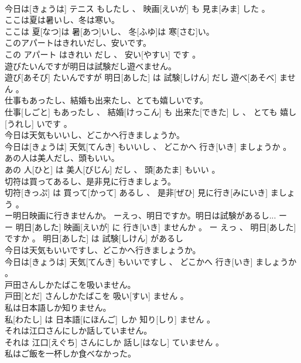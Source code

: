 \documentclass[8pt]{extreport}
\begin{document}
\begin{CJK}{UTF8}{min}
\\	今日は[きょうは] テニス もしたし 、 映画[えいが] も 見ま[みま] した 。
\\	ここは夏は暑いし、冬は寒い。	
\\	ここは 夏[なつ]は 暑[あつ]いし、 冬[ふゆ]は 寒[さむ]い。
\\	このアパートはきれいだし、安いです。	
\\	この アパート はきれい だし 、 安い[やすい] です 。
\\	遊びたいんですが明日は試験だし遊べません。	
\\	遊び[あそび] たいんですが 明日[あした] は 試験[しけん] だし 遊べ[あそべ] ません 。
\\	仕事もあったし、結婚も出来たし、とても嬉しいです。	
\\	仕事[しごと] もあったし 、 結婚[けっこん] も 出来た[できた] し 、 とても 嬉し[うれし] いです 。
\\	今日は天気もいいし、どこかへ行きましょうか。	
\\	今日は[きょうは] 天気[てんき] もいいし 、 どこかへ 行き[いき] ましょうか 。
\\	あの人は美人だし、頭もいい。	
\\	あの 人[ひと] は 美人[びじん] だし 、 頭[あたま] もいい 。
\\	切符は買ってあるし、是非見に行きましょう。	
\\	切符[きっぷ] は 買って[かって] あるし 、 是非[ぜひ] 見に行き[みにいき] ましょう 。
\\	ー明日映画に行きませんか。 ーえっ、明日ですか。明日は試験があるし...	ー
\\	ー 明日[あした] 映画[えいが] に 行き[いき] ませんか 。 ー えっ 、 明日[あした] ですか 。 明日[あした] は 試験[しけん] があるし 
\\	今日は天気もいいですし、どこかへ行きましょうか。	
\\	今日は[きょうは] 天気[てんき] もいいですし 、 どこかへ 行き[いき] ましょうか 。
\\	戸田さんしかたばこを吸いません。	
\\	戸田[とだ] さんしかたばこを 吸い[すい] ません 。
\\	私は日本語しか知りません。	
\\	私[わたし] は 日本語[にほんご] しか 知り[しり] ません 。
\\	それは江口さんにしか話していません。	
\\	それは 江口[えぐち] さんにしか 話し[はなし] ていません 。
\\	私はご飯を一杯しか食べなかった。	

\end{CJK}
\end{document}
